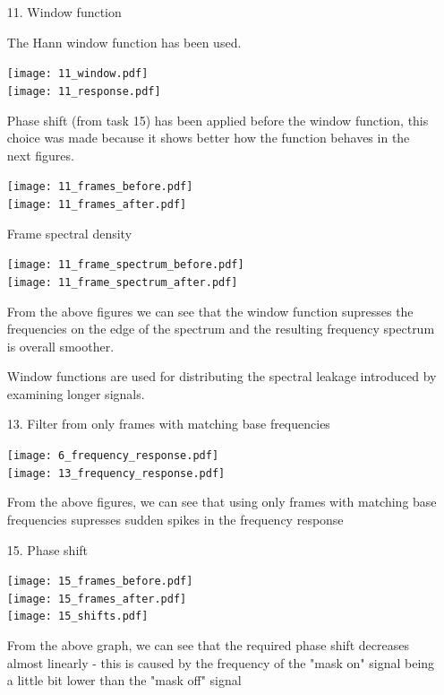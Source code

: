 \documentclass[a4paper, 11pt]{article}
\begin{document}
    \begin{enumerate}
        \item[11.]
        Window function

        The Hann window function has been used.

        \texttt{[image: 11\_window.pdf]} \\
        \texttt{[image: 11\_response.pdf]}

        Phase shift (from task 15) has been applied before the window function,
        this choice was made because it shows better how the function behaves in the next figures.

        \texttt{[image: 11\_frames\_before.pdf]} \\
        \texttt{[image: 11\_frames\_after.pdf]}

        \newpage
        Frame spectral density

        \texttt{[image: 11\_frame\_spectrum\_before.pdf]} \\
        \texttt{[image: 11\_frame\_spectrum\_after.pdf]}

        From the above figures we can see that the window function
        supresses the frequencies on the edge of the spectrum and the resulting frequency spectrum is overall smoother.

        Window functions are used for distributing the spectral leakage introduced by examining longer signals.

        \vspace{6mm}
        \item[13.]
        Filter from only frames with matching base frequencies

        \texttt{[image: 6\_frequency\_response.pdf]} \\
        \texttt{[image: 13\_frequency\_response.pdf]}

        From the above figures, we can see that using only frames with matching base frequencies supresses
        sudden spikes in the frequency response

        \newpage
        \item[15.]
        Phase shift

        \texttt{[image: 15\_frames\_before.pdf]} \\
        \texttt{[image: 15\_frames\_after.pdf]} \\
        \texttt{[image: 15\_shifts.pdf]}

        From the above graph, we can see that the required phase shift decreases almost linearly -
        this is caused by the frequency of the "mask on" signal being a little bit lower than the "mask off" signal


\end{enumerate}
\end{document}
